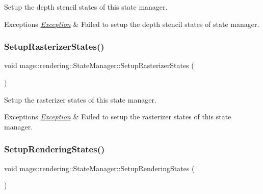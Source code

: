 Setup the depth stencil states of this state manager.


\begin{DoxyExceptions}{Exceptions}
{\em \mbox{\hyperlink{classmage_1_1_exception}{Exception}}} & Failed to setup the depth stencil states of state manager. \\
\hline
\end{DoxyExceptions}
\mbox{\label{classmage_1_1rendering_1_1_state_manager_a6cee7878db58409e6527d84de1bec5c8}} 
\subsubsection{\texorpdfstring{Setup\+Rasterizer\+States()}{SetupRasterizerStates()}}
{\footnotesize\ttfamily void mage\+::rendering\+::\+State\+Manager\+::\+Setup\+Rasterizer\+States (\begin{DoxyParamCaption}{ }\end{DoxyParamCaption})\hspace{0.3cm}{\ttfamily [private]}}

Setup the rasterizer states of this state manager.


\begin{DoxyExceptions}{Exceptions}
{\em \mbox{\hyperlink{classmage_1_1_exception}{Exception}}} & Failed to setup the rasterizer states of this state manager. \\
\hline
\end{DoxyExceptions}
\mbox{\label{classmage_1_1rendering_1_1_state_manager_ac2da3d4e04b0ef43e286e4661bca8deb}} 
\subsubsection{\texorpdfstring{Setup\+Rendering\+States()}{SetupRenderingStates()}}
{\footnotesize\ttfamily void mage\+::rendering\+::\+State\+Manager\+::\+Setup\+Rendering\+States (\begin{DoxyParamCaption}{ }\end{DoxyParamCaption})\hspace{0.3cm}{\ttfamily [private]}}

